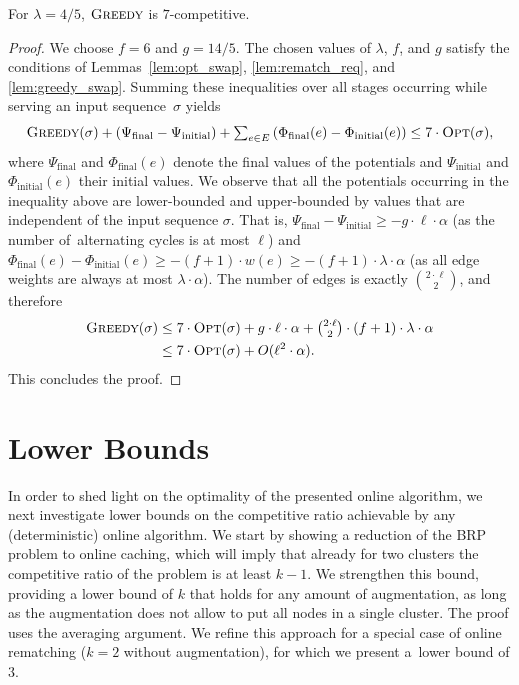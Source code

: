 \begin{theorem}
\label{thm:rematching}
For $\lambda = 4/5$, $\textsc{Greedy}$ is $7$-competitive.
\end{theorem}

\begin{proof}
We choose $f = 6$ and $g = 14/5$. The chosen values of $\lambda$, $f$, and $g$
satisfy the conditions of Lemmas~\ref{lem:opt_swap}, \ref{lem:rematch_req},
and \ref{lem:greedy_swap}. Summing these
inequalities over all stages occurring while serving an input sequence~$\sigma$
yields
\begin{equation*}
	\textstyle \textsc{Greedy}(\sigma) + (\Psi_\textrm{final} - \Psi_\textrm{initial})
	+ \sum_{e \in E} \left( 
		\Phi_\textrm{final}(e) - \Phi_\textrm{initial}(e) \right)
	\leq 7 \cdot \textsc{Opt}(\sigma),
\end{equation*}
where $\Psi_\textrm{final}$ and $\Phi_\textrm{final}(e)$ denote the final
values of the potentials and $\Psi_\textrm{initial}$ and
$\Phi_\textrm{initial}(e)$ their initial values. We observe that all the
potentials occurring in the inequality above are lower-bounded and
upper-bounded by values that are independent of the input sequence $\sigma$.
That is, $\Psi_\textrm{final} - \Psi_\textrm{initial} \geq - g \cdot \ell
\cdot \alpha$ (as the number of~alternating cycles is at most $\ell$) and
$\Phi_\textrm{final}(e) - \Phi_\textrm{initial}(e) \geq - (f+1) \cdot w(e)
\geq - (f+1) \cdot \lambda \cdot \alpha$ (as all edge weights are always 
at most $\lambda \cdot \alpha$). The number of edges is exactly $\binom{2
\cdot \ell}{2}$, and therefore
\begin{align*}
	 \textsc{Greedy}(\sigma) 
	\leq &\; 7 \cdot \textsc{Opt}(\sigma) 
	+ \textstyle g \cdot \ell \cdot \alpha + \binom{2 \cdot \ell}{2} \cdot (f+1) \cdot 
	\lambda \cdot \alpha \\
	\leq &\; 7 \cdot \textsc{Opt}(\sigma) 
	+ O(\ell^2 \cdot \alpha).
\end{align*}
This concludes the proof.
\end{proof}



\section{Lower Bounds}
\label{sec:lower}

In order to shed light on the optimality of the presented online algorithm, we
next investigate lower bounds on the competitive ratio achievable by any
(deterministic) online algorithm. We start by showing a reduction of the BRP
problem to online caching, which will imply that already for two clusters the
competitive ratio of the problem is at least $k-1$. We strengthen this bound,
providing a lower bound of $k$ that holds for any amount of augmentation, as
long as the augmentation does not allow to put all nodes in a single 
cluster. The proof uses the averaging argument. We refine this approach for a
special case of online rematching ($k = 2$ without augmentation), for which we
present a~lower bound of $3$.


